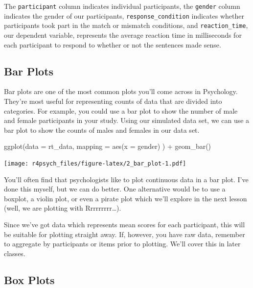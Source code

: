 \documentclass[
]{book}
\newenvironment{Shaded}{\begin{snugshade}}{\end{snugshade}}
\newcommand{\AttributeTok}[1]{\textcolor[rgb]{0.77,0.63,0.00}{#1}}
\newcommand{\FunctionTok}[1]{\textcolor[rgb]{0.00,0.00,0.00}{#1}}
\newcommand{\NormalTok}[1]{#1}
\newcommand{\SpecialCharTok}[1]{\textcolor[rgb]{0.00,0.00,0.00}{#1}}
\begin{document}
The \texttt{participant} column indicates individual participants, the \texttt{gender} column indicates the gender of our participants, \texttt{response\_condition} indicates whether participants took part in the match or mismatch conditions, and \texttt{reaction\_time}, our dependent variable, represents the average reaction time in milliseconds for each participant to respond to whether or not the sentences made sense.

\hypertarget{bar-plots}{%
\subsection{Bar Plots}\label{bar-plots}}

Bar plots are one of the most common plots you'll come across in Psychology. They're most useful for representing counts of data that are divided into categories. For example, you could use a bar plot to show the number of male and female participants in your study. Using our simulated data set, we can use a bar plot to show the counts of males and females in our data set.

\begin{Shaded}
\begin{Highlighting}[]
\FunctionTok{ggplot}\NormalTok{(}\AttributeTok{data =}\NormalTok{ rt\_data, }
       \AttributeTok{mapping =} \FunctionTok{aes}\NormalTok{(}\AttributeTok{x =}\NormalTok{ gender)}
\NormalTok{       ) }\SpecialCharTok{+}
  \FunctionTok{geom\_bar}\NormalTok{()}
\end{Highlighting}
\end{Shaded}

\texttt{[image: r4psych\_files/figure-latex/2\_bar\_plot-1.pdf]}

You'll often find that psychologists like to plot continuous data in a bar plot. I've done this myself, but we can do better. One alternative would be to use a boxplot, a violin plot, or even a pirate plot which we'll explore in the next lesson (well, we are plotting with Rrrrrrrrr\ldots).

Since we've got data which represents mean scores for each participant, this will be suitable for plotting straight away. If, however, you have raw data, remember to aggregate by participants or items prior to plotting. We'll cover this in later classes.

\hypertarget{box-plots}{%
\subsection{Box Plots}\label{box-plots}}
\end{document}
